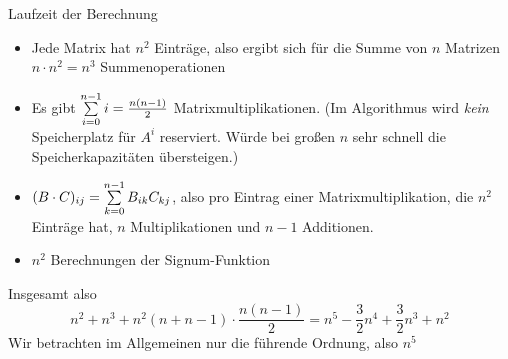 \begin{frame}{Laufzeit der Berechnung}
	\begin{itemize}[<+->]
		\item Jede Matrix hat $n^2$ Einträge, also ergibt sich für die Summe von $n$ Matrizen $n\cdot n^2=n^3$ Summenoperationen 
		\item  Es gibt $\sum\limits_{i=0}^{n-1} i = \frac{n(n-1)}{2} $ Matrixmultiplikationen. (Im Algorithmus wird \emph{kein} Speicherplatz für $A^i$ reserviert. Würde bei großen $n$ sehr schnell die Speicherkapazitäten übersteigen.) 
		\item $(B\cdot C)_{ij} = \sum\limits_{k=0}^{n-1} B_{ik} C_{kj}$, also pro Eintrag einer Matrixmultiplikation, die $n^2$ Einträge hat, $n$ Multiplikationen und $n-1$ Additionen. 
		\item $n^2$ Berechnungen der Signum-Funktion 
	\end{itemize}
	\pause
	Insgesamt also $$ n^2 + n^3 + n^2(n+n-1)\cdot \frac{n(n-1)}{2} = n^5 - \frac{3}{2} n^4 + \frac{3}{2} n^3 + n^2 $$
	Wir betrachten im Allgemeinen nur die führende Ordnung, also $n^5$
\end{frame}

